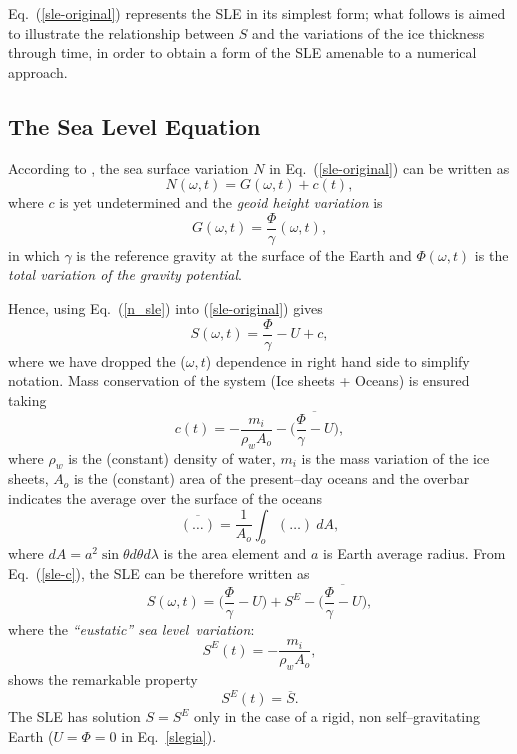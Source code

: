 \documentclass[11pt,fleqn,a4paper,titlepage]{article}
\newcommand\sealevel{sea level~}
\begin{document}
Eq.~(\ref{sle-original}) represents the SLE in its simplest form; 
what follows is aimed to illustrate the relationship between $S$ and the variations of the ice thickness through time, in order to obtain a form of the SLE amenable to a numerical approach. 

\subsection{The Sea Level Equation}\label{sec:sle}

According to \citet{Farrell_and_Clark_1976}, the sea surface variation $N$ in Eq.~(\ref{sle-original}) can be written as 
\begin{equation}\label{n_sle}
{N}(\omega, t) = G(\omega, t) + c(t),  
\end{equation}
where $c$ is yet undetermined and the \emph{geoid height variation} is 
\begin{equation}\label{g_sle}
G(\omega, t) = \frac{\Phi}{\gamma}(\omega, t),  
\end{equation}
in which $\gamma$ is the reference gravity at the surface of the Earth and $\Phi(\omega,t)$ is the 
\emph{total
variation of the gravity potential}. 

Hence, using Eq.~(\ref{n_sle}) into (\ref{sle-original}) gives 
\begin{equation}\label{sle-c}
S(\omega, t) = \frac{\Phi}{\gamma} - U +c, 
\end{equation}
where we have dropped the ($\omega,t$) dependence in right hand side to simplify notation. Mass
conservation of the system (Ice sheets + Oceans) is ensured taking   
\begin{equation}\label{c-constant}
c(t) = - \frac{m_i}{\rho_{w}A_{o}} - \overline{ \biggl( \frac{\Phi}{\gamma} - U\biggr)}, 
\end{equation}
where $\rho_{w}$ is the (constant) density of water, $m_{i}$ is the mass 
variation of the ice sheets, $A_{o}$ is the (constant) area of the present--day oceans 
and the overbar indicates the average over the surface of the oceans 
\begin{equation}\label{average}
\overline {(\ldots)} = \frac{1}{A_{o}} \int_{o} (\ldots) ~dA,
\end{equation}
where $dA=a^{2}\sin\theta d\theta d\lambda$ is the area element 
and $a$ is Earth average radius. From Eq.~(\ref{sle-c}), the SLE can be therefore written as 
\begin{equation}\label{slegia}
S(\omega,t) = \biggl( \frac{\Phi}{\gamma} - U\biggr)  +S^E   - \overline{ \biggl( \frac{\Phi}{\gamma} - U\biggr)}, 
\end{equation}
where the \emph{``eustatic'' \sealevel variation}: 
\begin{equation}\label{eustatic}
S^{E}(t) = - \frac{m_i}{\rho_w A_o},  
\end{equation}
shows the remarkable property 
\begin{equation}
S^{E}(t) = \overline{S}. 
\end{equation}
\noindent The SLE has solution $S=S^{E}$ only in the case of a rigid, 
non self--gravitating Earth ($U = \Phi = 0$ in Eq.~\ref{slegia}).
\end{document}
